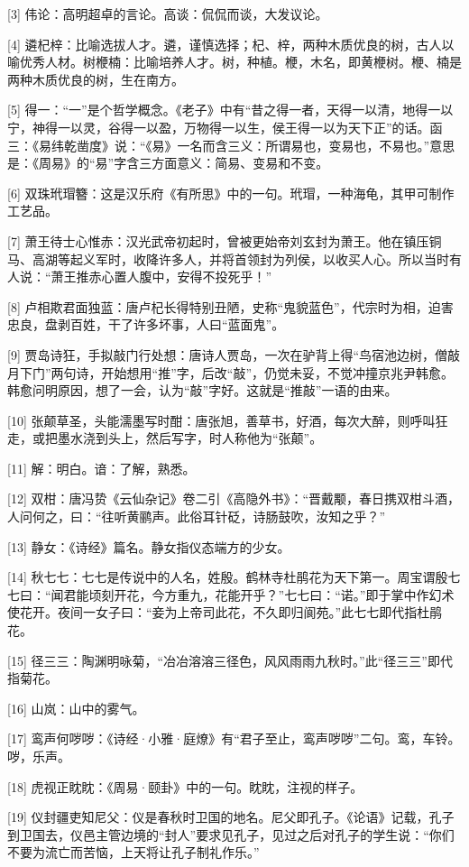 \documentclass[12pt,UTF8]{ctexbook}
\begin{document}
[3] 伟论：高明超卓的言论。高谈：侃侃而谈，大发议论。

[4] 遴杞梓：比喻选拔人才。遴，谨慎选择；杞、梓，两种木质优良的树，古人以喻优秀人材。树楩楠：比喻培养人才。树，种植。楩，木名，即黄楩树。楩、楠是两种木质优良的树，生在南方。

[5] 得一：“一”是个哲学概念。《老子》中有“昔之得一者，天得一以清，地得一以宁，神得一以灵，谷得一以盈，万物得一以生，侯王得一以为天下正”的话。函三：《易纬乾凿度》说：“《易》一名而含三义：所谓易也，变易也，不易也。”意思是：《周易》的“易”字含三方面意义：简易、变易和不变。

[6] 双珠玳瑁簪：这是汉乐府《有所思》中的一句。玳瑁，一种海龟，其甲可制作工艺品。

[7] 萧王待士心惟赤：汉光武帝初起时，曾被更始帝刘玄封为萧王。他在镇压铜马、高湖等起义军时，收降许多人，并将首领封为列侯，以收买人心。所以当时有人说：“萧王推赤心置人腹中，安得不投死乎！”

[8] 卢相欺君面独蓝：唐卢杞长得特别丑陋，史称“鬼貌蓝色”，代宗时为相，迫害忠良，盘剥百姓，干了许多坏事，人曰“蓝面鬼”。

[9] 贾岛诗狂，手拟敲门行处想：唐诗人贾岛，一次在驴背上得“鸟宿池边树，僧敲月下门”两句诗，开始想用“推”字，后改“敲”，仍觉未妥，不觉冲撞京兆尹韩愈。韩愈问明原因，想了一会，认为“敲”字好。这就是“推敲”一语的由来。

[10] 张颠草圣，头能濡墨写时酣：唐张旭，善草书，好酒，每次大醉，则呼叫狂走，或把墨水浇到头上，然后写字，时人称他为“张颠”。

[11] 解：明白。谙：了解，熟悉。

[12] 双柑：唐冯贽《云仙杂记》卷二引《高隐外书》：“晋戴颙，春日携双柑斗酒，人问何之，曰：“往听黄鹂声。此俗耳针砭，诗肠鼓吹，汝知之乎？”

[13] 静女：《诗经》篇名。静女指仪态端方的少女。

[14] 秋七七：七七是传说中的人名，姓殷。鹤林寺杜鹃花为天下第一。周宝谓殷七七曰：“闻君能顷刻开花，今方重九，花能开乎？”七七曰：“诺。”即于掌中作幻术使花开。夜间一女子曰：“妾为上帝司此花，不久即归阆苑。”此七七即代指杜鹃花。

[15] 径三三：陶渊明咏菊，“冶冶溶溶三径色，风风雨雨九秋时。”此“径三三”即代指菊花。

[16] 山岚：山中的雾气。

[17] 鸾声何哕哕：《诗经·小雅·庭燎》有“君子至止，鸾声哕哕”二句。鸾，车铃。哕，乐声。

[18] 虎视正眈眈：《周易·颐卦》中的一句。眈眈，注视的样子。

[19] 仪封疆吏知尼父：仪是春秋时卫国的地名。尼父即孔子。《论语》记载，孔子到卫国去，仪邑主管边境的“封人”要求见孔子，见过之后对孔子的学生说：“你们不要为流亡而苦恼，上天将让孔子制礼作乐。”
\end{document}
